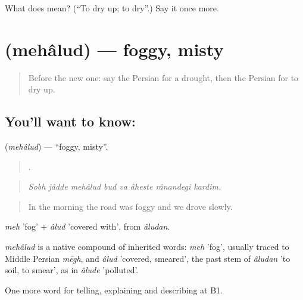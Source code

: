 \begin{tcolorbox}[breakable,colback=teal!4,colframe=teal!35!black,title={Before you move on}]
What does   mean? (\textquotedblleft{}To dry up; to dry\textquotedblright{}.) Say it once more.
\end{tcolorbox}
\section[\texorpdfstring{\fa{مه} \fa{آلود} (mehâlud)}{مه آلود (mehâlud)}]{  (mehâlud) — foggy, misty}

\label{lesson:FA-C478-mehalud}



\begin{quote}
Before the new one: say the Persian for a drought, then the Persian for to dry up.
\end{quote}

\subsection*{You'll want to know:  }
\textbf{ } (\emph{mehâlud}) — \textquotedblleft{}foggy, misty\textquotedblright{}.

\begin{quote}
        .
\end{quote}

\begin{quote}
\emph{Sobh jâdde mehâlud bud va âheste rânandegi kardim.}
\end{quote}

\begin{quote}
In the morning the road was foggy and we drove slowly.
\end{quote}

\emph{meh} 'fog' + \emph{âlud} 'covered with', from \emph{âludan}.

\begin{cousinweb}
\emph{mehâlud} is a native compound of inherited words: \emph{meh} 'fog', usually traced to Middle Persian \emph{mēgh}, and \emph{âlud} 'covered, smeared', the past stem of \emph{âludan} 'to soil, to smear', as in \emph{âlude} 'polluted'.
\end{cousinweb}

\begin{grammarlens}[title={What you've built}]
One more word for telling, explaining and describing at B1.
\end{grammarlens}

